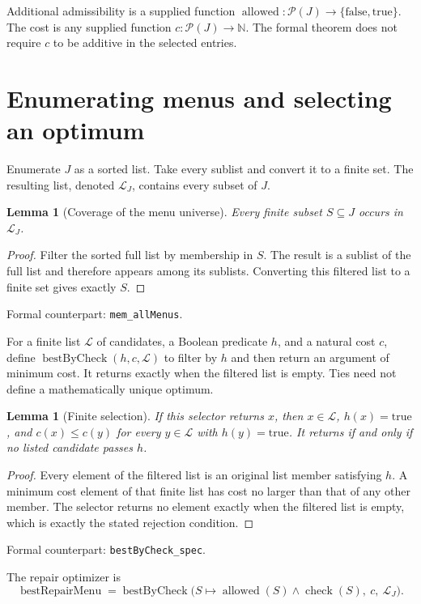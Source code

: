 \documentclass[11pt,letterpaper,oneside,openany]{book}
\theoremstyle{quiet}
\newtheorem{lemma}[theorem]{Lemma}
\newcommand{\N}{\mathbb{N}}
\newcommand{\code}[1]{\texttt{\detokenize{#1}}}
\newcommand{\formal}[1]{\par\nobreak\begingroup\footnotesize\color{Slate}\sffamily Formal counterpart: \normalfont\nolinkurl{#1}.\par\endgroup}
\begin{document}
Additional admissibility is a supplied function $\operatorname{allowed}:\mathcal P(J)\to\{\mathrm{false},\mathrm{true}\}$. The cost is any supplied function $c:\mathcal P(J)\to\N$. The formal theorem does not require $c$ to be additive in the selected entries.

\section{Enumerating menus and selecting an optimum}
Enumerate $J$ as a sorted list. Take every sublist and convert it to a finite set. The resulting list, denoted $\mathcal L_J$, contains every subset of $J$.

\begin{lemma}[Coverage of the menu universe]\label{lem:allmenus}
Every finite subset $S\subseteq J$ occurs in $\mathcal L_J$.
\end{lemma}
\begin{proof}
Filter the sorted full list by membership in $S$. The result is a sublist of the full list and therefore appears among its sublists. Converting this filtered list to a finite set gives exactly $S$.
\end{proof}
\formal{mem_allMenus}

For a finite list $\mathcal L$ of candidates, a Boolean predicate $h$, and a natural cost $c$, define $\operatorname{bestByCheck}(h,c,\mathcal L)$ to filter by $h$ and then return an argument of minimum cost. It returns \code{none} exactly when the filtered list is empty. Ties need not define a mathematically unique optimum.

\begin{lemma}[Finite selection]\label{lem:best}
If this selector returns $x$, then $x\in\mathcal L$, $h(x)=\mathrm{true}$, and $c(x)\leq c(y)$ for every $y\in\mathcal L$ with $h(y)=\mathrm{true}$. It returns \code{none} if and only if no listed candidate passes $h$.
\end{lemma}
\begin{proof}
Every element of the filtered list is an original list member satisfying $h$. A minimum cost element of that finite list has cost no larger than that of any other member. The selector returns no element exactly when the filtered list is empty, which is exactly the stated rejection condition.
\end{proof}
\formal{bestByCheck_spec}

The repair optimizer is
\[
\operatorname{bestRepairMenu}
=\operatorname{bestByCheck}\bigl(
S\mapsto\operatorname{allowed}(S)\wedge\operatorname{check}(S),\ c,\ \mathcal L_J\bigr).
\]
\end{document}
